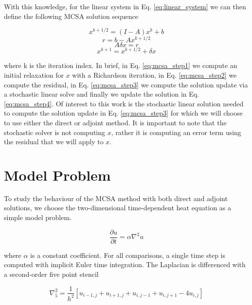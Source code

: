\documentclass[note]{TechNote}
\begin{document}
With this knowledge, for the linear system in
Eq. \ref{eq:linear_system} we can then define the following MCSA
solution sequence

\begin{equation}
  x^{k+1/2} = (I-A)x^k + b
  \label{eq:mcsa_step1}
\end{equation}
\begin{equation}
  r = b - A x^{k+1/2}
  \label{eq:mcsa_step2}
\end{equation}
\begin{equation}
  A \delta x = r
  \label{eq:mcsa_step3}
\end{equation}
\begin{equation}
  x^{k+1} = x^{k+1/2} + \delta x
  \label{eq:mcsa_step4}
\end{equation}

where k is the iteration index. In brief, in Eq. \ref{eq:mcsa_step1}
we compute an initial relaxation for $x$ with a Richardson iteration,
in Eq. \ref{eq:mcsa_step2} we compute the residual, in
Eq. \ref{eq:mcsa_step3} we compute the solution update via a
stochastic linear solve and finally we update the solution in
Eq. \ref{eq:mcsa_step4}. Of interest to this work is the stochastic
linear solution needed to compute the solution update in Eq.
\ref{eq:mcsa_step3} for which we will choose to use either the direct
or adjoint method. It is important to note that the stochastic solver
is not computing $x$, rather it is computing an error term using the
residual that we will apply to $x$.

\section{Model Problem}
To study the behaviour of the MCSA method with both direct and adjoint
solutions, we choose the two-dimensional time-dependent heat equation
as a simple model problem.

\begin{equation}
  \frac{\partial u}{\partial t} = \alpha \nabla^2 u
  \label{eq:heat_equation}
\end{equation}

where $\alpha$ is a constant coefficient. For all comparisons, a
single time step is computed with implicit Euler time integration. The
Laplacian is differenced with a second-order five point stencil

\begin{equation}
  \nabla^2_5 = \frac{1}{h^2}[u_{i-1,j} + u_{i+1,j} + u_{i,j-1} +
  u_{i,j+1} - 4 u_{i,j}]
  \label{eq:five_point_stencil}
\end{equation}
\end{document}
